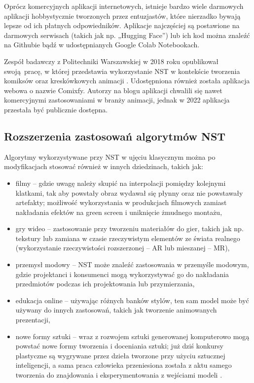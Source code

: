 \documentclass[12pt]{article}
\begin{document}
Oprócz komercyjnych aplikacji internetowych, istnieje bardzo wiele darmowych aplikacji hobbystycznie tworzonych przez entuzjastów, które nierzadko bywają lepsze od ich płatnych odpowiedników. Aplikacje najczęściej są postawione na darmowych serwisach (takich jak np. „Hugging Face”) lub ich kod można znaleźć na Githubie bądź w udostępnianych Google Colab Notebookach.

Zespół badawczy z Politechniki Warszawskiej w 2018 roku opublikował swoją pracę, w której przedstawia wykorzystanie NST w kontekście tworzenia komiksów oraz kreskówkowych animacji \cite{52}. Udostępniona również została aplikacja webowa o nazwie Comixfy. Autorzy na blogu aplikacji chwalili się nawet komercyjnymi zastosowaniami w branży animacji, jednak w 2022 aplikacja przestała być publicznie dostępna.

\subsection{Rozszerzenia zastosowań algorytmów NST}

\indent

Algorytmy wykorzystywane przy NST w ujęciu klasycznym można po modyfikacjach stosować również w innych dziedzinach, takich jak:

\begin{itemize}
    \item filmy – gdzie uwagę należy skupić na interpolacji pomiędzy kolejnymi klatkami, tak aby powstały obraz wydawał się płynny oraz nie powstawały artefakty; możliwość wykorzystania w produkcjach filmowych zamiast nakładania efektów na green screen i uniknięcie żmudnego montażu,
    \item gry wideo – zastosowanie przy tworzeniu materiałów do gier, takich jak np. tekstury lub zamiana w czasie rzeczywistym elementów ze świata realnego (wykorzystanie rzeczywistości rozszerzonej – AR lub mieszanej – MR),
    \item przemysł modowy – NST może znaleźć zastosowania w przemyśle modowym, gdzie projektanci i konsumenci mogą wykorzystywać go do nakładania przedmiotów podczas ich projektowania lub przymierzania,
    \item edukacja online – używając różnych banków stylów, ten sam model może być używany do innych zastosowań, takich jak tworzenie animowanych prezentacji,
    \item nowe formy sztuki – wraz z rozwojem sztuki generowanej komputerowo mogą powstać nowe formy tworzenia i doceniania sztuki; już dziś konkursy plastyczne są wygrywane przez dzieła tworzone przy użyciu sztucznej inteligencji, a sama praca człowieka przeniesiona została z aktu samego tworzenia do znajdowania i eksperymentowania z wejściami modeli \cite{55}.
\end{itemize}
\newpage
\end{document}
